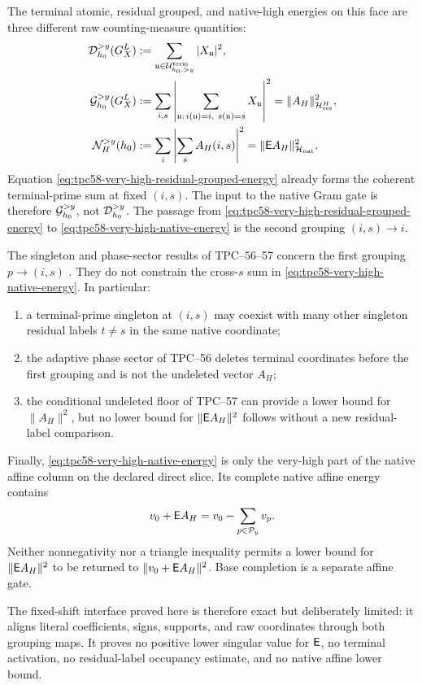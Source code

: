 The terminal atomic, residual grouped, and native-high energies on this
face are three different raw counting-measure quantities:
\begin{align}
 \mathcal D_{h_0}^{>y}(G_X^L)
 &:=\sum_{\mathfrak u\in\mathcal U_{h_0,>y}^{\rm term}}
      |X_{\mathfrak u}|^2,
 \label{eq:tpc58-very-high-terminal-diagonal}\\
 \mathcal G_{h_0}^{>y}(G_X^L)
 &:=\sum_{i,s}
      \left|\sum_{\substack{\mathfrak u:\,
                    i(\mathfrak u)=i,\ s(\mathfrak u)=s}}
             X_{\mathfrak u}\right|^2
   =\|A_H\|_{\mathcal H_{\rm res}^{H}}^2,
 \label{eq:tpc58-very-high-residual-grouped-energy}\\
 \mathcal N_{H}^{>y}(h_0)
 &:=\sum_i\left|\sum_s A_H(i,s)\right|^2
   =\|\mathsf E A_H\|_{\mathcal H_{\rm nat}}^2.
 \label{eq:tpc58-very-high-native-energy}
\end{align}
Equation \eqref{eq:tpc58-very-high-residual-grouped-energy} already forms
the coherent terminal-prime sum at fixed \((i,s)\).  The input to the native
Gram gate is therefore \(\mathcal G_{h_0}^{>y}\), not
\(\mathcal D_{h_0}^{>y}\).  The passage from
\eqref{eq:tpc58-very-high-residual-grouped-energy} to
\eqref{eq:tpc58-very-high-native-energy} is the second grouping
\((i,s)\to i\).

The singleton and phase-sector results of TPC--56--57 concern the first
grouping \(p\to(i,s)\) \citep{WangTPC56,WangTPC57}.  They do not constrain
the cross-\(s\) sum in
\eqref{eq:tpc58-very-high-native-energy}.  In particular:
\begin{enumerate}[label=\textup{(\roman*)},leftmargin=3em]
 \item a terminal-prime singleton at \((i,s)\) may coexist with many other
       singleton residual labels \(t\ne s\) in the same native coordinate;
 \item the adaptive phase sector of TPC--56 deletes terminal coordinates
       before the first grouping and is not the undeleted vector \(A_H\);
 \item the conditional undeleted floor of TPC--57 can provide a lower
       bound for \(\|A_H\|^2\), but no lower bound for
       \(\|\mathsf E A_H\|^2\) follows without a new residual-label comparison.
\end{enumerate}

Finally, \eqref{eq:tpc58-very-high-native-energy} is only the very-high
part of the native affine column on the declared direct slice.  Its complete
native affine energy contains
\begin{equation}
 v_0+\mathsf E A_H=v_0-\sum_{p\in\mathcal P_y}v_p.
 \label{eq:tpc58-full-affine-sign-interface}
\end{equation}
Neither nonnegativity nor a triangle inequality permits a lower bound for
\(\|\mathsf E A_H\|^2\) to be returned to
\(\|v_0+\mathsf E A_H\|^2\).  Base completion is a separate affine gate.

The fixed-shift interface proved here is therefore exact but deliberately
limited: it aligns literal coefficients, signs, supports, and raw
coordinates through both grouping maps.  It proves no positive lower
singular value for \(\mathsf E\), no terminal activation, no residual-label
occupancy estimate, and no native affine lower bound.
